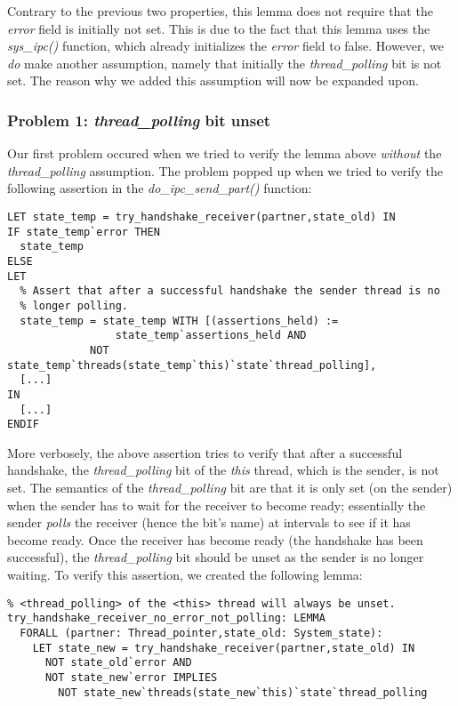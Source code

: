 Contrary to the previous two properties, this lemma does not require that the \emph{error} field is initially not set. This is due to the fact that this lemma uses the \emph{sys\_ipc()} function, which already initializes the \emph{error} field to false. However, we \textit{do} make another assumption, namely that initially the \emph{thread\_polling} bit is not set. The reason why we added this assumption will now be expanded upon.

\subsubsection{Problem 1: \emph{thread\_polling} bit unset}
Our first problem occured when we tried to verify the lemma above \textit{without} the \emph{thread\_polling} assumption. The problem popped up when we tried to verify the following assertion in the \emph{do\_ipc\_send\_part()} function:

\lstset{language=PVS}
\begin{lstlisting}[caption={PVS: \emph{thread\_polling} assertion.}]
% Start with a handshake and immediately return if an error occured.
LET state_temp = try_handshake_receiver(partner,state_old) IN
IF state_temp`error THEN
  state_temp   
ELSE 
LET 
  % Assert that after a successful handshake the sender thread is no 
  % longer polling.
  state_temp = state_temp WITH [(assertions_held) := 
                 state_temp`assertions_held AND 
             NOT state_temp`threads(state_temp`this)`state`thread_polling],
  [...]
IN
  [...]
ENDIF
\end{lstlisting}

More verbosely, the above assertion tries to verify that after a successful handshake, the \emph{thread\_polling} bit of the \emph{this} thread, which is the sender, is not set. The semantics of the \emph{thread\_polling} bit are that it is only set (on the sender) when the sender has to wait for the receiver to become ready; essentially the sender \textit{polls} the receiver (hence the bit's name) at intervals to see if it has become ready. Once the receiver has become ready (the handshake has been successful), the \emph{thread\_polling} bit should be unset as the sender is no longer waiting. To verify this assertion, we created the following lemma:

\lstset{language=PVS}
\begin{lstlisting}[caption={PVS: \emph{try\_handshake\_receiver\_no\_error\_not\_polling} lemma.}]
% If no error has occured when calling try_handshake_receiver(), the
% <thread_polling> of the <this> thread will always be unset.
try_handshake_receiver_no_error_not_polling: LEMMA
  FORALL (partner: Thread_pointer,state_old: System_state):
    LET state_new = try_handshake_receiver(partner,state_old) IN
      NOT state_old`error AND 
      NOT state_new`error IMPLIES
        NOT state_new`threads(state_new`this)`state`thread_polling
\end{lstlisting}

